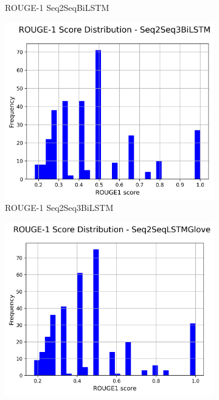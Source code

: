 \begin{figure}[H]
\begin{subfigure}{0.24\textwidth}
        \caption{ROUGE-1 Seq2SeqBiLSTM}
    \end{subfigure}
    \hfill
    \begin{subfigure}{0.24\textwidth}
        \centering
        \includegraphics[width=\textwidth]{media/Seq2Seq3BiLSTM_rouge1_scores.png}
        \caption{ROUGE-1 Seq2Seq3BiLSTM}
    \end{subfigure}
    \hfill
    \begin{subfigure}{0.24\textwidth}
        \centering
        \includegraphics[width=\textwidth]{media/Seq2SeqLSTMGlove_rouge1_scores.png}

\end{subfigure}
\end{figure}
